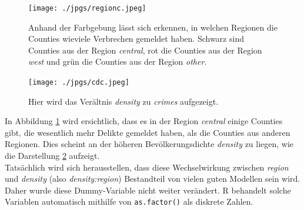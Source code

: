 \begin{figure}
\centering
\texttt{[image: ./jpgs/regionc.jpeg]}
 \abovecaptionskip
\caption{Anhand der Farbgebung l\"asst sich erkennen, in welchen Regionen die Counties wieviele Verbrechen gemeldet haben. Schwarz sind Counties aus der Region \textit{central}, rot die Counties aus der Region \textit{west} und gr\"un die Counties aus der Region \textit{other}.}
\label{fig:rc}
\end{figure}

\begin{figure}
\centering
\texttt{[image: ./jpgs/cdc.jpeg]}
 \abovecaptionskip
\caption{Hier wird das Ver\"altnis \textit{density} zu \textit{crimes} aufgezeigt.}
\label{fig:cdc}
\end{figure}


In Abbildung \ref{fig:rc} wird ersichtlich, dass es in der Region \textit{central} einige Counties gibt, die wesentlich mehr Delikte gemeldet haben, als die Counties aus anderen Regionen.
Dies scheint an der h\"oheren Bev\"olkerungsdichte \textit{density} zu liegen, wie die Darstellung \ref{fig:cdc} aufzeigt. \\
Tats\"achlich wird sich herausstellen, dass diese Wechselwirkung zwischen \textit{region} und \textit{density} (also \textit{density:region}) Bestandteil von vielen guten Modellen sein wird.
Daher wurde diese Dummy-Variable nicht weiter ver\"andert.
\textsf{R} behandelt solche Variablen automatisch mithilfe von \texttt{as.factor()} als diskrete Zahlen.


